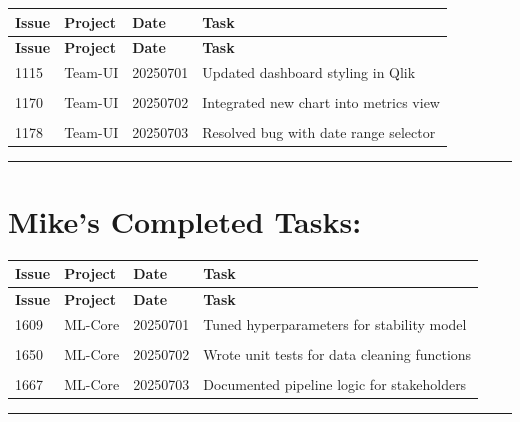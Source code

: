 \documentclass{article}
\begin{document}
\begin{longtable}{@{}p{2.5cm} p{2.5cm} p{2.5cm} p{6.5cm}@{}}
\toprule
\textbf{ Issue } & \textbf{ Project } & \textbf{ Date } & \textbf{ Task } \\
\midrule
\endfirsthead

\toprule
\textbf{ Issue } & \textbf{ Project } & \textbf{ Date } & \textbf{ Task } \\
\midrule
\endhead

\bottomrule
\endfoot


1115 & Team-UI & 20250701 & Updated dashboard styling in Qlik \\

\\[-0.5ex]  %


1170 & Team-UI & 20250702 & Integrated new chart into metrics view \\

\\[-0.5ex]  %


1178 & Team-UI & 20250703 & Resolved bug with date range selector \\


\end{longtable}


\vspace{0.5cm}
\hrule
\vspace{1cm}


\section*{\centering \textbf{ Mike's Completed Tasks: }}
\label{sec:mike_tasks}


\begin{longtable}{@{}p{2.5cm} p{2.5cm} p{2.5cm} p{6.5cm}@{}}
\toprule
\textbf{ Issue } & \textbf{ Project } & \textbf{ Date } & \textbf{ Task } \\
\midrule
\endfirsthead

\toprule
\textbf{ Issue } & \textbf{ Project } & \textbf{ Date } & \textbf{ Task } \\
\midrule
\endhead

\bottomrule
\endfoot


1609 & ML-Core & 20250701 & Tuned hyperparameters for stability model \\

\\[-0.5ex]  %


1650 & ML-Core & 20250702 & Wrote unit tests for data cleaning functions \\

\\[-0.5ex]  %


1667 & ML-Core & 20250703 & Documented pipeline logic for stakeholders \\


\end{longtable}


\vspace{0.5cm}
\hrule
\vspace{1cm}
\end{document}

